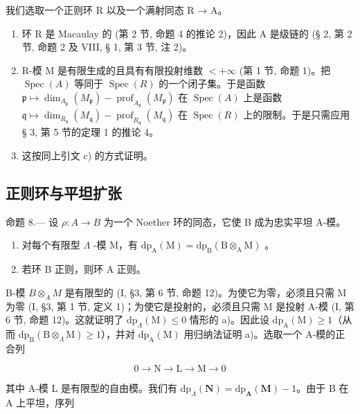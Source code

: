 我们选取一个正则环 R 以及一个满射同态 R → A。

\begin{enumerate}
\def\labelenumi{\alph{enumi})}
\item
  环 R 是 Macaulay 的 (第 2 节, 命题 4 的推论 2)，因此 A 是级链的 (§ 2, 第 2 节, 命题 2 及 VIII, § 1, 第 3 节, 注 2)。
\item
  R-模 M 是有限生成的且具有有限投射维数 \(< +\infty\) (第 1 节, 命题 1)。把 \(\operatorname{Spec}(A)\) 等同于 \(\operatorname{Spec}(R)\) 的一个闭子集。于是函数 \(\mathfrak{p} \mapsto \dim_{A_{\mathfrak{p}}} (M_{\mathfrak{p}}) - \operatorname{prof}_{A_{\mathfrak{p}}} (M_{\mathfrak{p}})\) 在 \(\operatorname{Spec}(A)\) 上是函数 \(\mathfrak{q} \mapsto \dim_{R_{\mathfrak{q}}} (M_{\mathfrak{q}}) - \operatorname{prof}_{R_{\mathfrak{q}}} (M_{\mathfrak{q}})\) 在 \(\operatorname{Spec}(R)\) 上的限制。于是只需应用 § 3, 第 5 节的定理 1 的推论 4。
\item
  这按同上引文 c) 的方式证明。
\end{enumerate}

\subsection{正则环与平坦扩张}

命题 8.--- 设 \(\rho: A \to B\) 为一个 Noether 环的同态，它使 B 成为忠实平坦 A-模。

\begin{enumerate}
\def\labelenumi{\alph{enumi})}
\item
  对每个有限型 \(\Lambda\) -模 M，有 \(\mathrm{dp}_{\mathrm{A}}(\mathrm{M}) = \mathrm{dp}_{\mathrm{B}}(\mathrm{B} \otimes_{\mathrm{A}} \mathrm{M})\) 。
\item
  若环 B 正则，则环 A 正则。
\end{enumerate}

B-模 \(B \otimes_{A} M\) 是有限型的 (I, §3, 第 6 节, 命题 12)。为使它为零，必须且只需 M 为零 (I, §3, 第 1 节, 定义 1)；为使它是投射的，必须且只需 M 是投射 A-模 (I, 第 6 节, 命题 12)。这就证明了 \(\mathrm{dp}_{\Lambda}(\mathrm{M}) \leqslant 0\) 情形的 a)。因此设 \(\mathrm{dp}_{\mathrm{A}}(\mathrm{M}) \geqslant 1\)（从而 \(\mathrm{dp}_{\mathrm{B}}(\mathrm{B} \otimes_{\Lambda} \mathrm{M}) \geqslant 1\)），并对 \(\mathrm{dp}_{\mathrm{A}}(\mathrm{M})\) 用归纳法证明 a)。选取一个 A-模的正合列

\[
0 \to \mathrm{N} \to \mathrm{L} \to \mathrm{M} \to 0
\]

其中 A-模 L 是有限型的自由模。我们有 \(\mathrm{dp}_{\Lambda}(\mathbf{N}) = \mathrm{dp}_{\mathbf{A}}(\mathbf{M}) - 1\)。由于 B 在 A 上平坦，序列

